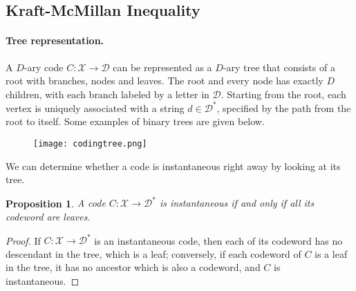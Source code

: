 \documentclass{article}
\numberwithin{equation}{section}
\renewcommand{\cal}{\mathcal}
\theoremstyle{plain}
\newtheorem{proposition}[theorem]{Proposition}
\theoremstyle{definition}
\begin{document}
\subsection{Kraft-McMillan Inequality}
\paragraph{Tree representation.} A $D$-ary code $C:\cal{X}\to\cal{D}$ can be represented as a $D$-ary tree that consists of a root with branches, nodes and leaves. The root and every node has exactly $D$ children, with each branch labeled by a letter in $\cal{D}$. Starting from the root, each vertex is uniquely associated with a string $d\in\cal{D}^*$, specified by the path from the root to itself. Some examples of binary trees are given below.
\begin{figure}[H]
\texttt{[image: codingtree.png]}
\end{figure}

We can determine whether a code is instantaneous right away by looking at its tree.
\begin{proposition}
A code $C:\cal{X}\to\cal{D}^*$ is instantaneous if and only if all its codeword are leaves.
\end{proposition}
\begin{proof}
If $C:\cal{X}\to\cal{D}^*$ is an instantaneous code, then each of its codeword has no descendant in the tree, which is a leaf; conversely, if each codeword of $C$ is a leaf in the tree, it has no ancestor which is also a codeword, and $C$ is instantaneous.
\end{proof}
\end{document}
